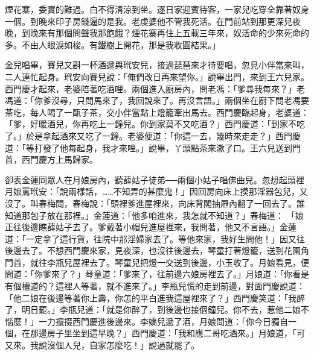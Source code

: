 煙花寨，委實的難過。白不得清涼到坐。逐日家迎賓待客，一家兒吃穿全靠著奴身一個。到晚來印子房錢逼的是我。老虔婆他不管我死活。在門前站到那更深兒夜晚，到晚來有那個問聲我那飽餓？煙花寨再住上五載三年來，奴活命的少來死命的多。不由人眼淚如梭。有鐵樹上開花，那是我收圓結果。」

金兒唱畢，賽兒又斟一杯酒遞與玳安兒，接過琵琶來才待要唱，忽見小伴當來叫，二人連忙起身。玳安向賽兒說：「俺們改日再來望你。」說畢出門，來到王六兒家。西門慶才起來，老婆陪著吃酒哩。兩個進入廚房內，問老馮：「爹尋我每來？」老馮道：「你爹沒尋，只問馬來了，我回說來了。再沒言語。」兩個坐在廚下問老馮要茶吃，每人喝了一甌子茶，交小伴當點上燈籠牽出馬去。西門慶臨起身，老婆道：「爹，好暖酒兒，你再吃上一鐘兒。你到家莫不又吃酒？」西門慶道：「到家不吃了。」於是拿起酒來又吃了一鐘。老婆便道：「你這一去，幾時來走走？」西門慶道：「等打發了他每起身，我才來哩。」說畢，丫頭點茶來漱了口。王六兒送到門首，西門慶方上馬歸家。

卻表金蓮同眾人在月娘房內，聽薛姑子徒弟──兩個小姑子唱佛曲兒。忽想起頭裡月娘罵玳安：「說兩樣話，……不知弄的甚麼鬼！」因回房向床上摸那淫器包兒，又沒了。叫春梅問，春梅說：「頭裡爹進屋裡來，向床背閣抽屜內翻了一回去了。誰知道那包子放在那裡。」金蓮道：「他多咱進來，我怎就不知道？」春梅道： 「娘正往後邊瞧薛姑子去了。爹戴著小帽兒進屋裡來，我問著，他又不言語。」金蓮道：「一定拿了這行貨，往院中那淫婦家去了。等他來家，我好生問他！」因又往後邊去了。不想西門慶來家，見夜深，也沒往後邊去，琴童打著燈籠，送到花園角門首，就往李瓶兒屋裡去了。琴童兒把燈一交送到後邊，小玉收了。月娘看見，便問道：「你爹來了？」琴童道：「爹來了，往前邊六娘房裡去了。」月娘道：「你看是有個槽道的？這裡人等著，就不進來了。」李瓶兒慌的走到前邊，對面門慶說道：「他二娘在後邊等著你上壽，你怎的平白進我這屋裡來了？」西門慶笑道：「我醉了，明日罷。」李瓶兒道：「就是你醉了，到後邊也接個鐘兒。你不去，惹他二娘不惱麼！」一力攛掇西門慶進後邊來。李嬌兒遞了酒，月娘問道：「你今日獨自一個，在那邊房子里坐到這早晚？」西門慶道：「我和應二哥吃酒來。」月娘道，「可又來。我說沒個人兒，自家怎麼吃！」說過就罷了。

